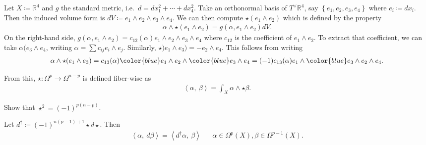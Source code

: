 \begin{example}[?]

Let \(X\coloneqq{\mathbb{R}}^4\) and \(g\) the standard metric,
i.e.~\(d = dx_1^2 + \cdots + dx_4^2\). Take an orthonormal basis of
\(T^\vee{\mathbb{R}}^4\), say \(\left\{{ e_1, e_2, e_3, e_4 }\right\}\)
where \(e_i \coloneqq dx_i\). Then the induced volume form is
\(dV \coloneqq e_1 \wedge e_2 \wedge e_3 \wedge e_4\). We can then
compute \(\star(e_1 \wedge e_2)\) which is defined by the property
\begin{align*}
\alpha\wedge \star( e_1 \wedge e_2) = g( \alpha, e_1 \wedge e_2) dV
.\end{align*}
On the right-hand side,
\(g( \alpha, e_1 \wedge e_2) = c_{12}(\alpha) e_1 \wedge e_2 \wedge e_3 \wedge e_4\)
where \(c_{12}\) is the coefficient of \(e_1 \wedge e_2\). To extract
that coefficient, we can take \(\alpha( e_3 \wedge e_4\), writing
\(\alpha = \sum c_{ij} e_i \wedge e_j\). Similarly,
\(\star)e_1 \wedge e_3) = -e_2 \wedge e_4\). This follows from writing
\begin{align*}
\alpha \wedge \star(e_1 \wedge e_3) =
c_{13}(\alpha) {\color{blue} e_1} \wedge e_2 \wedge {\color{blue} e_3 } \wedge e_4 =
(-1) c_{13}(\alpha) e_1 \wedge {\color{blue} e_3 \wedge e_2} \wedge e_4
.\end{align*}

From this, \(\star: \Omega^p \to \Omega^{n-p}\) is defined fiber-wise as
\begin{align*}
{\left\langle { \alpha},~{ \beta} \right\rangle} = \int_X \alpha\wedge \star\beta
.\end{align*}

\end{example}

\begin{exercise}[?]

Show that \(\star^2 = (-1)^{p(n-p)}\).

\end{exercise}

\begin{proposition}

Let \(d^\dagger \coloneqq(-1)^{n(p-1) +1} \star d \star\). Then
\begin{align*}
{\left\langle {\alpha},~{ d \beta} \right\rangle} = {\left\langle {d^\dagger \alpha},~{ \beta} \right\rangle} && \alpha\in \Omega^p(X), \beta\in \Omega^{p-1}(X)
.\end{align*}

\end{proposition}

